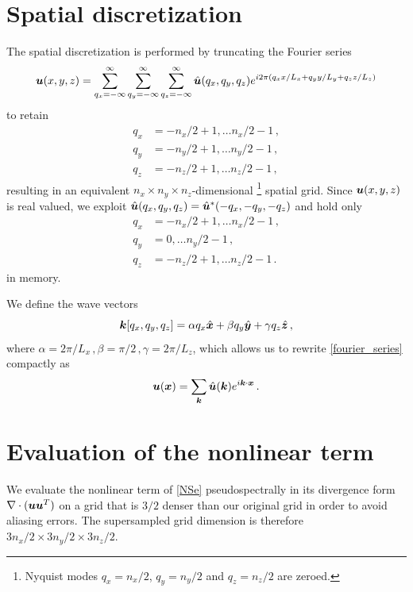 \documentclass[a4paper, 11pt]{article}
\begin{document}
\section{Spatial discretization}
The spatial discretization is performed by truncating the Fourier series
\begin{equation}
    \bm{u}(x, y, z) = 
        \sum_{q_x = -\infty}^{\infty}
        \sum_{q_y = -\infty}^{\infty}
        \sum_{q_z = -\infty}^{\infty}
        \hat{\bm{u}} (q_x, q_y, q_z)
        e^{i 2\pi (q_x x / L_x + q_y y / L_y + q_z z / L_z)} 
        \label{fourier_series}
\end{equation}
to retain 
\begin{align}
    q_x &= -n_x / 2 + 1, \ldots n_x / 2 - 1 \,, \\
    q_y &= -n_y / 2 + 1, \ldots n_y / 2 - 1 \,, \\
    q_z &= -n_z / 2 + 1, \ldots n_z / 2 - 1 \,,
\end{align}
resulting in an equivalent $n_x \times n_y \times n_z$-dimensional
\footnote{Nyquist modes \(q_x=n_x /2\), \(q_y=n_y/2\) and \(q_z=n_z/2\) are zeroed.}
 spatial
grid.
Since $\bm{u} (x,y,z)$ is real valued, we exploit 
$\hat{\bm{u}} (q_x, q_y, q_z) = \hat{\bm{u}}^* (- q_x, - q_y, - q_z) $ and hold only 
\begin{align}
    q_x &= -n_x / 2 + 1, \ldots n_x / 2 - 1 \,, \\
    q_y &= 0, \ldots n_y / 2 - 1 \,, \\
    q_z &= -n_z / 2 + 1, \ldots n_z / 2 - 1 \,.
\end{align}
in memory. 

We define the wave vectors
\begin{equation}
    \bm{k}[q_x, q_y, q_z] = \alpha q_x \hat{\bm{x}} + \beta q_y \hat{\bm{y}} + \gamma q_z \hat{\bm{z}} \,, 
\end{equation}
where $\alpha = 2 \pi / L_x \,, \beta = \pi / 2 \,, \gamma = 2 \pi / L_z$, which allows 
us to rewrite \cref{fourier_series} compactly as 
\begin{equation}
    \bm{u} (\bm{x}) = \sum_{\bm{k}} \hat{\bm{u}} (\bm{k}) e^{i \bm{k} \cdot \bm{x}} \, .
\end{equation}

\section{Evaluation of the nonlinear term}

We evaluate the nonlinear term of \cref{NSe} pseudospectrally in
its divergence form $\nabla \cdot (\bm{u} \bm{u}^T)$ on a grid that is $3/2$ denser than 
our original grid in order to avoid aliasing errors. The supersampled grid dimension 
is therefore $3n_x/2 \times 3n_y/2 \times 3n_z/2$. 
\end{document}
